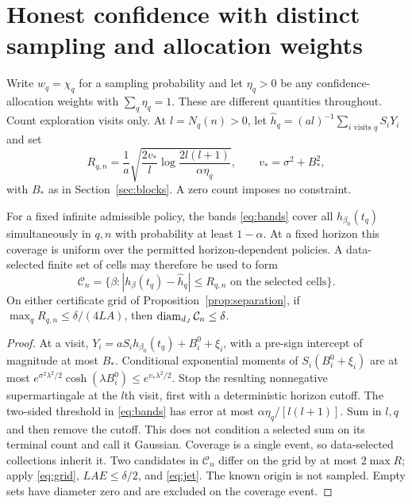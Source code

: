 \section{Honest confidence with distinct sampling and allocation weights}
\label{sec:confidence}
Write $w_q=\chi_q$ for a sampling probability and let $\eta_q>0$ be any
confidence-allocation weights with $\sum_q\eta_q=1$. These are different
quantities throughout. Count exploration visits only. At $l=N_q(n)>0$, let
$\widehat h_q=(al)^{-1}\sum_{i\text{ visits }q}S_iY_i$ and set
\begin{equation}
 R_{q,n}=\frac1a\sqrt{\frac{2v_*}{l}
            \log\frac{2l(l+1)}{\alpha\eta_q}},
 \qquad v_*=\sigma^2+B_*^2,
 \label{eq:bands}
\end{equation}
with $B_*$ as in Section~\ref{sec:blocks}. A zero count imposes no constraint.

\begin{theorem}
\label{thm:confidence}
For a fixed infinite admissible policy, the bands \eqref{eq:bands} cover all
$h_{\beta_0}(t_q)$ simultaneously in $q,n$ with probability at least $1-\alpha$.
At a fixed horizon this coverage is uniform over the permitted horizon-dependent
policies. A data-selected finite set of cells may therefore be used to form
\[
 \mathcal C_n=\{\beta:|h_\beta(t_q)-\widehat h_q|\le R_{q,n}
                   \text{ on the selected cells}\}.
\]
On either certificate grid of Proposition~\ref{prop:separation}, if
$\max_q R_{q,n}\le\delta/(4LA)$, then $\operatorname{diam}_{d_J}\mathcal C_n\le\delta$.
\end{theorem}
\begin{proof}
At a visit, $Y_i=aS_i h_{\beta_0}(t_q)+B_i^0+\xi_i$, with a pre-sign
intercept of magnitude at most $B_*$. Conditional exponential moments of
$S_i(B_i^0+\xi_i)$ are at most
$e^{\sigma^2\lambda^2/2}\cosh(\lambda B_i^0)\le e^{v_*\lambda^2/2}$.
Stop the resulting nonnegative supermartingale at the $l$th visit, first with
a deterministic horizon cutoff. The two-sided threshold in \eqref{eq:bands}
has error at most $\alpha\eta_q/[l(l+1)]$. Sum in $l,q$ and then remove the
cutoff. This does not condition a selected sum on its terminal count and
call it Gaussian. Coverage is a single event, so data-selected collections
inherit it. Two candidates in $\mathcal C_n$ differ on the grid by at most
$2\max R$; apply \eqref{eq:grid}, $LAE\le\delta/2$, and \eqref{eq:jet}.
The known origin is not sampled. Empty sets have diameter zero and are excluded
on the coverage event.
\end{proof}

